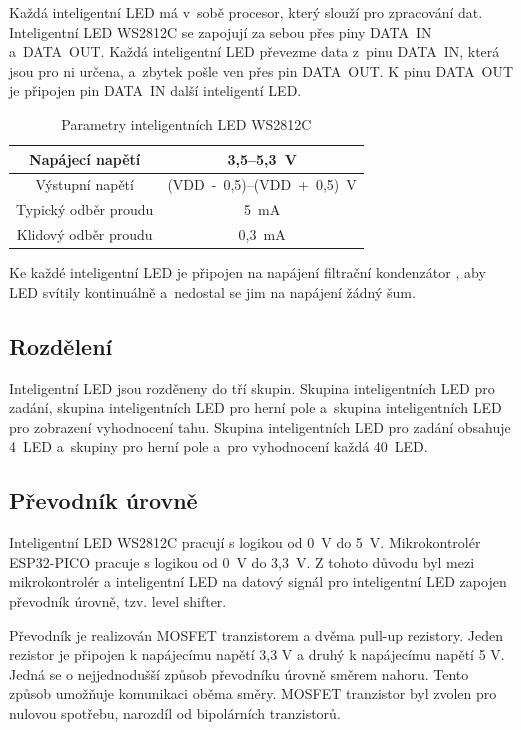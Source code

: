   Každá inteligentní LED má v~sobě procesor, který slouží pro zpracování dat. 
  Inteligentní LED WS2812C se zapojují za sebou přes piny DATA~IN a~DATA~OUT. Každá inteligentní LED převezme data z~pinu 
  DATA~IN, která jsou pro ni určena, a~zbytek pošle ven přes pin DATA~OUT. K pinu DATA~OUT je připojen pin DATA~IN další inteligentí LED. 

  \begin{table}[!h]
    \caption{Parametry inteligentních LED WS2812C \cite{WS2812C_datasheet}}
    \begin{center}
        \begin{tabular}{|c|c|}
            \hline
            Napájecí napětí       & 3,5--5,3~V \\
            \hline
            Výstupní napětí       & (VDD~-~0,5)--(VDD~+~0,5)~V \\
            \hline
            Typický odběr proudu  & 5~mA \\
            \hline
            Klidový odběr proudu  & 0,3~mA \\
            \hline
        \end{tabular}    
    \end{center}
  \end{table}

  Ke každé inteligentní LED je připojen na napájení filtrační kondenzátor \cite{WS2812C_datasheet}, aby LED svítily kontinuálně 
  a~nedostal se jim na napájení žádný šum.

  \subsection{Rozdělení}
  Inteligentní LED jsou rozděneny do tří skupin. Skupina inteligentních LED pro zadání, skupina inteligentních LED pro herní pole 
  a~skupina inteligentních LED pro zobrazení vyhodnocení tahu.
  Skupina inteligentních LED pro zadání obsahuje 4~LED a~skupiny pro herní pole a~pro vyhodnocení každá 40~LED.

  \subsection{Převodník úrovně}
  Inteligentní LED WS2812C pracují s logikou od 0~V do 5~V. Mikrokontrolér ESP32-PICO pracuje s logikou od 0~V do 3,3~V. 
  Z tohoto důvodu byl mezi mikrokontrolér a inteligentní LED na datový signál pro inteligentní LED zapojen převodník úrovně, 
  tzv. level shifter. 
  
  Převodník je realizován MOSFET tranzistorem a dvěma pull-up rezistory. Jeden rezistor je připojen k napájecímu napětí 3,3 V a druhý k 
  napájecímu napětí 5 V. Jedná se o nejjednodušší způsob převodníku úrovně směrem nahoru. Tento způsob umožňuje komunikaci oběma směry. 
  MOSFET tranzistor byl zvolen pro nulovou spotřebu, narozdíl od bipolárních tranzistorů. 

